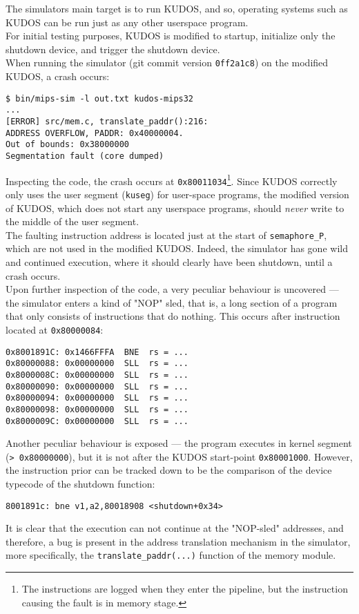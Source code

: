 The simulators main target is to run KUDOS, and so, operating systems such as KUDOS
can be run just as any other userspace program.\\
For initial testing purposes, KUDOS is modified to startup, initialize only
the shutdown device, and trigger the shutdown device.\\
When running the simulator (git commit version \texttt{0ff2a1c8}) on the modified
KUDOS, a crash occurs:
\begin{verbatim}
$ bin/mips-sim -l out.txt kudos-mips32
...
[ERROR] src/mem.c, translate_paddr():216:
ADDRESS OVERFLOW, PADDR: 0x40000004.
Out of bounds: 0x38000000
Segmentation fault (core dumped)
\end{verbatim}
Inspecting the code, the crash occurs at \texttt{0x80011034}\footnote{The instructions
are logged when they enter the pipeline, but the instruction causing the fault is
in memory stage.}. Since KUDOS correctly only uses the user segment (\texttt{kuseg})
for user-space programs, the modified version of KUDOS, which does not start
any userspace programs, should \textit{never} write to the middle of the user segment.\\
The faulting instruction address is located just at the start of \texttt{semaphore\_P},
which are not used in the modified KUDOS. Indeed, the simulator has gone wild and
continued execution, where it should clearly have been shutdown, until a crash
occurs.\\
Upon further inspection of the code, a very peculiar behaviour is uncovered ---
the simulator enters a kind of "NOP" sled, that is, a long section of a program
that only consists of instructions that do nothing. This occurs after instruction
located at \texttt{0x80000084}:
\begin{verbatim}
0x8001891C: 0x1466FFFA  BNE  rs = ...
0x80000088: 0x00000000  SLL  rs = ...
0x8000008C: 0x00000000  SLL  rs = ...
0x80000090: 0x00000000  SLL  rs = ...
0x80000094: 0x00000000  SLL  rs = ...
0x80000098: 0x00000000  SLL  rs = ...
0x8000009C: 0x00000000  SLL  rs = ...
\end{verbatim}
Another peculiar behaviour is exposed --- the program executes in kernel segment
(\texttt{> 0x80000000}), but it is not after the KUDOS start-point \texttt{0x80001000}.
However, the instruction prior can be tracked down to be the comparison of the
device typecode of the shutdown function:
\begin{verbatim}
8001891c: bne v1,a2,80018908 <shutdown+0x34>
\end{verbatim}

It is clear that the execution can not continue at the "NOP-sled" addresses,
and therefore, a bug is present in the address translation mechanism in the simulator,
more specifically, the \texttt{translate\_paddr(...)} function of the memory module.
